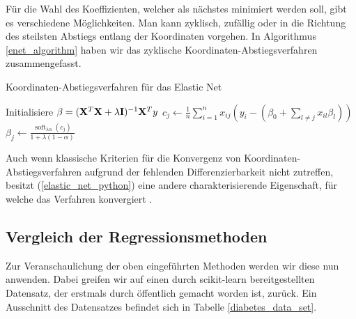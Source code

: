 Für die Wahl des Koeffizienten, welcher als nächstes minimiert werden soll, gibt es verschiedene Möglichkeiten. Man kann zyklisch, zufällig oder in die Richtung des steilsten Abstiegs entlang der Koordinaten vorgehen. In Algorithmus \ref{enet_algorithm} haben wir das zyklische Koordinaten-Abstiegsverfahren zusammengefasst.

\begin{algorithm}[tbh]
    \caption{Koordinaten-Abstiegsverfahren für das Elastic Net}
    \label{enet_algorithm}
    \begin{algorithmic}[1]
        	\State Initialisiere $\beta = (\mathbf{X}^T\mathbf{X} + \lambda\mathbf{I})^{-1}\mathbf{X}^Ty$
                	\State $c_j \gets \frac{1}{n}\sum_{i=1}^n x_{ij}(y_i - (\beta_0 + \sum_{l \neq j} x_{il}\beta_l))$
                	\State $\beta_j \gets \frac{\operatorname{soft}_{\lambda\alpha}(c_j)}{1 + \lambda (1-\alpha)}$
        		\EndFor
        	\EndWhile
        \EndProcedure
    \end{algorithmic}
\end{algorithm} 

Auch wenn klassische Kriterien für die Konvergenz von Koordinaten-Abstiegsverfahren aufgrund der fehlenden Differenzierbarkeit nicht zutreffen, besitzt (\ref{elastic_net_python}) eine andere charakterisierende Eigenschaft, für welche das Verfahren konvergiert \cite{tseng}.




\subsection{Vergleich der Regressionsmethoden}
\label{comparison_linear_models}

Zur Veranschaulichung der oben eingeführten Methoden werden wir diese nun anwenden. Dabei greifen wir auf einen durch scikit-learn \cite{scikit_learn} bereitgestellten Datensatz, der erstmals durch \cite{efron_lars} öffentlich gemacht worden ist, zurück. Ein Ausschnitt des Datensatzes befindet sich in Tabelle \ref{diabetes_data_set}.

